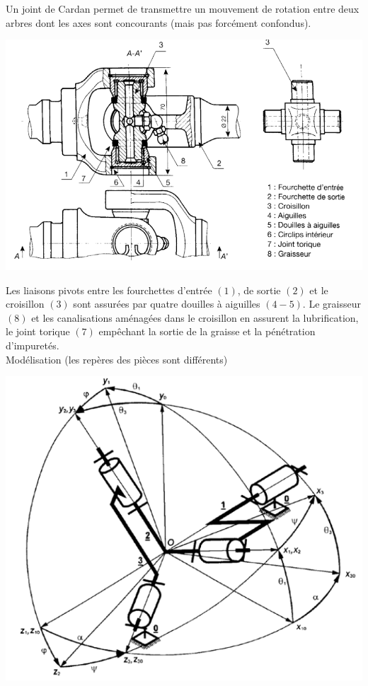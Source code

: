 

Un joint de Cardan permet de transmettre un mouvement de rotation entre deux arbres dont les axes sont concourants (mais pas forcément confondus).

\begin{center}
    \includegraphics[scale=0.3]{png/1_exo6.png}
\end{center}

Les liaisons pivots entre les fourchettes d'entrée $(1)$, de sortie $(2)$ et le croisillon $(3)$ sont assurées par quatre douilles à aiguilles $(4 - 5)$. Le graisseur $(8)$ et les canalisations aménagées dans le croisillon en assurent la lubrification, le joint torique $(7)$ empêchant la sortie de la graisse et la pénétration d'impuretés.\\
Modélisation (les repères des pièces sont différents)

\begin{center}
    \includegraphics[scale=0.5]{png/2_exo6.png}
\end{center}

